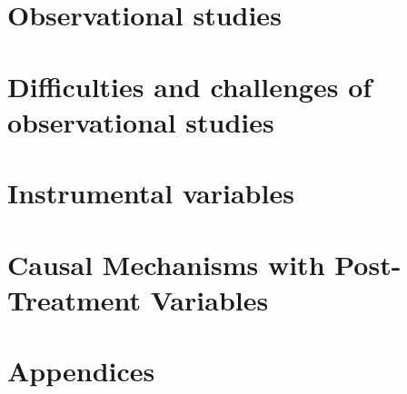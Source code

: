 \documentclass[krantz1]{krantz}
\renewcommand{\theparagraph}{\arabic{chapter}.\arabic{paragraph}}
\begin{document}
   
 
\part{Observational studies}\label{part::observational-studies}
    
   
   
    
      
    
  
\part{Difficulties and challenges of observational studies}\label{part::challenges-os}  
  
    
    
    
      
          
     

\part{Instrumental variables}\label{part::instrumentalvariables}
    
      
            
       
           

 

\part{Causal Mechanisms with Post-Treatment Variables}\label{part::post-treatmentvariable}
 
  
        
         
        



\appendix 
\part{Appendices}


\renewcommand{\theparagraph}{\Alph{chapter}.\arabic{paragraph}}
  









\printindex
\end{document}

